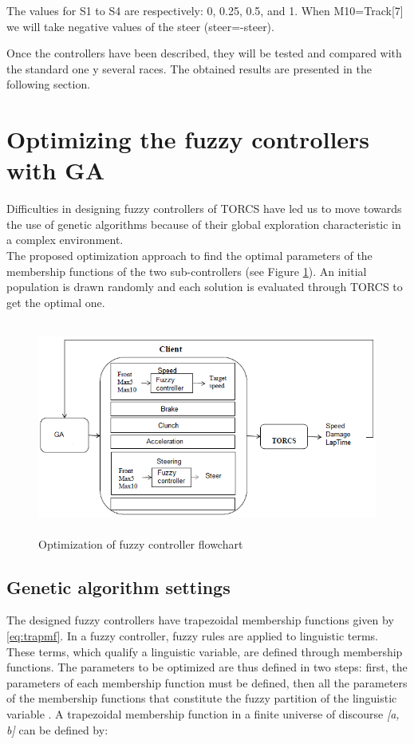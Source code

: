 \documentclass[runningheads,a4paper]{llncs}
\begin{document}
The values for S1 to S4 are respectively: 0, 0.25, 0.5, and 1.
When M10=Track[7] we will take negative values of the steer (steer=-steer).

Once the controllers have been described, they will be tested and compared with the standard one y several races. The obtained results are presented in the following section.


	
\section{Optimizing the fuzzy controllers with GA}

Difficulties in designing fuzzy controllers of TORCS  have led us to move towards the use of genetic algorithms because of their global exploration characteristic in a complex environment.\\
The proposed optimization approach to find the optimal parameters of the membership functions of the two sub-controllers \cite{evo17} (see Figure \ref{fig:ga}). An initial  population is drawn randomly and each solution is evaluated through TORCS to get the optimal one.
\begin{figure}[!ht]
	\label{fig:ga}
	\begin{center}
		\includegraphics[width=13cm,height=7cm]{fig/mo}
	\end{center}
	\caption{Optimization of fuzzy controller flowchart }
\end{figure}	
\subsection{Genetic algorithm settings}
The designed fuzzy controllers have trapezoidal membership functions given by \ref{eq:trapmf}.
In a fuzzy controller, fuzzy rules are applied to linguistic terms. These terms, which qualify a linguistic variable, are defined through membership functions. The parameters to be optimized are thus defined in two steps: first, the parameters of each membership function must be defined, then all the parameters of the membership functions that constitute the fuzzy partition of the linguistic variable \cite{ThangG08}.
A trapezoidal membership function in a finite universe of discourse \textit{[a, b]} can be defined by:
\end{document}

